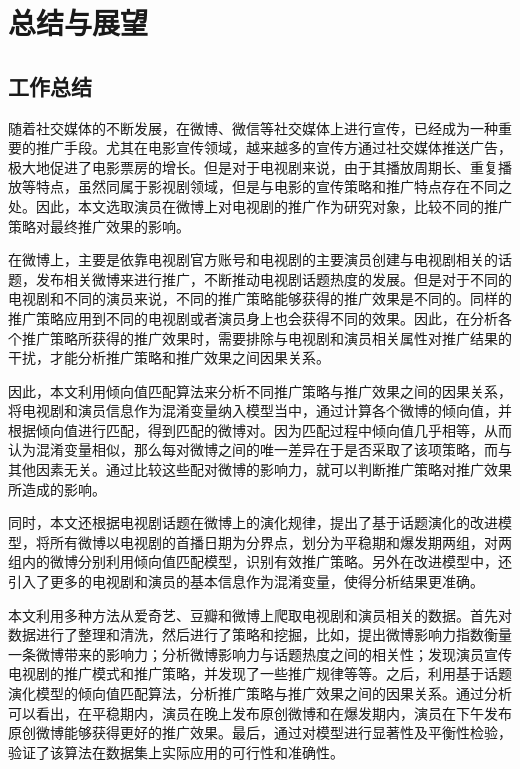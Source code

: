 \chapter{总结与展望}

\section{工作总结}

随着社交媒体的不断发展，在微博、微信等社交媒体上进行宣传，已经成为一种重要的推广手段。尤其在电影宣传领域，越来越多的宣传方通过社交媒体推送广告，极大地促进了电影票房的增长。但是对于电视剧来说，由于其播放周期长、重复播放等特点，虽然同属于影视剧领域，但是与电影的宣传策略和推广特点存在不同之处。因此，本文选取演员在微博上对电视剧的推广作为研究对象，比较不同的推广策略对最终推广效果的影响。

在微博上，主要是依靠电视剧官方账号和电视剧的主要演员创建与电视剧相关的话题，发布相关微博来进行推广，不断推动电视剧话题热度的发展。但是对于不同的电视剧和不同的演员来说，不同的推广策略能够获得的推广效果是不同的。同样的推广策略应用到不同的电视剧或者演员身上也会获得不同的效果。因此，在分析各个推广策略所获得的推广效果时，需要排除与电视剧和演员相关属性对推广结果的干扰，才能分析推广策略和推广效果之间因果关系。

因此，本文利用倾向值匹配算法来分析不同推广策略与推广效果之间的因果关系，将电视剧和演员信息作为混淆变量纳入模型当中，通过计算各个微博的倾向值，并根据倾向值进行匹配，得到匹配的微博对。因为匹配过程中倾向值几乎相等，从而认为混淆变量相似，那么每对微博之间的唯一差异在于是否采取了该项策略，而与其他因素无关。通过比较这些配对微博的影响力，就可以判断推广策略对推广效果所造成的影响。

同时，本文还根据电视剧话题在微博上的演化规律，提出了基于话题演化的改进模型，将所有微博以电视剧的首播日期为分界点，划分为平稳期和爆发期两组，对两组内的微博分别利用倾向值匹配模型，识别有效推广策略。另外在改进模型中，还引入了更多的电视剧和演员的基本信息作为混淆变量，使得分析结果更准确。

本文利用多种方法从爱奇艺、豆瓣和微博上爬取电视剧和演员相关的数据。首先对数据进行了整理和清洗，然后进行了策略和挖掘，比如，提出微博影响力指数衡量一条微博带来的影响力；分析微博影响力与话题热度之间的相关性；发现演员宣传电视剧的推广模式和推广策略，并发现了一些推广规律等等。之后，利用基于话题演化模型的倾向值匹配算法，分析推广策略与推广效果之间的因果关系。通过分析可以看出，在平稳期内，演员在晚上发布原创微博和在爆发期内，演员在下午发布原创微博能够获得更好的推广效果。最后，通过对模型进行显著性及平衡性检验，验证了该算法在数据集上实际应用的可行性和准确性。

